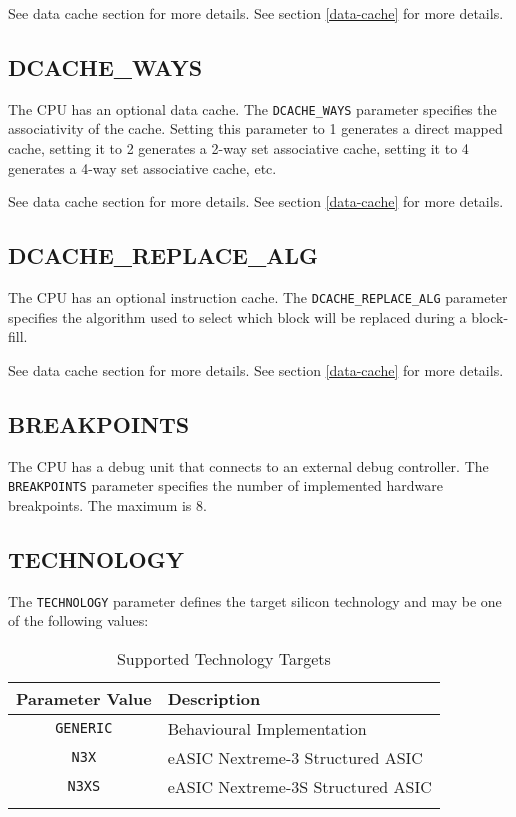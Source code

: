 \ifdefined\MARKDOWN
See data cache section for more details.
\else
See section \ref{data-cache}  for more details.
\fi

\subsection{DCACHE\_WAYS}\label{dcache_ways}

The CPU has an optional data cache. The \texttt{DCACHE\_WAYS} parameter
specifies the associativity of the cache. Setting this parameter to 1 generates
a direct mapped cache, setting it to 2 generates a 2-way set associative cache,
setting it to 4 generates a 4-way set associative cache, etc.

\ifdefined\MARKDOWN
See data cache section for more details.
\else
See section \ref{data-cache}  for more details.
\fi

\subsection{DCACHE\_REPLACE\_ALG}\label{dcache_replace_alg}

The CPU has an optional instruction cache. The \texttt{DCACHE\_REPLACE\_ALG}
parameter specifies the algorithm used to select which block will be
replaced during a block-fill.

\ifdefined\MARKDOWN
See data cache section for more details.
\else
See section \ref{data-cache}  for more details.
\fi

\subsection{BREAKPOINTS}\label{breakpoints}

The CPU has a debug unit that connects to an external debug controller.
The \texttt{BREAKPOINTS} parameter specifies the number of implemented hardware
breakpoints. The maximum is 8.

\subsection{TECHNOLOGY}\label{technology}

The \texttt{TECHNOLOGY} parameter defines the target silicon technology and may
be one of the following values:

\begin{longtable}[]{@{}cl@{}}
\toprule
Parameter Value & Description\tabularnewline
\midrule
\endhead
\texttt{GENERIC} & Behavioural Implementation\tabularnewline
\texttt{N3X} & eASIC Nextreme-3 Structured ASIC\tabularnewline
\texttt{N3XS} & eASIC Nextreme-3S Structured ASIC\tabularnewline
\bottomrule
\caption{Supported Technology Targets}
\label{tab:supported-tech-targets}

\end{longtable}

